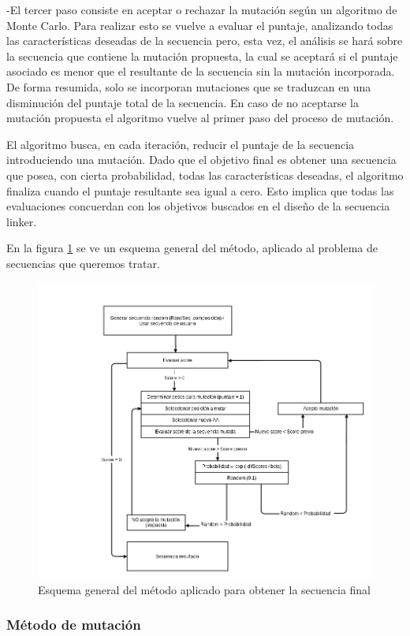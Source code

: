     -El tercer paso consiste en aceptar o rechazar la mutación según un algoritmo de Monte Carlo. Para realizar esto se vuelve a evaluar el puntaje, analizando todas las características deseadas de la secuencia pero, esta vez, el análisis se hará sobre la secuencia que contiene la mutación propuesta, la cual se aceptará si el puntaje asociado es menor que el  resultante de la secuencia sin la mutación incorporada. De forma resumida, solo se incorporan mutaciones que se traduzcan en una disminución del puntaje total de la secuencia.
En caso de no aceptarse la mutación propuesta el algoritmo vuelve al primer paso del proceso de mutación.

El algoritmo busca, en cada iteración, reducir el puntaje de la secuencia introduciendo una mutación. Dado que el objetivo final es obtener una secuencia que posea, con cierta probabilidad, todas las características deseadas, el algoritmo finaliza cuando el puntaje resultante sea igual a cero. Esto implica que todas las evaluaciones concuerdan con los objetivos buscados en el diseño de la secuencia linker.


En la figura \ref{fig:esquema-algoritmo} se ve un esquema general del método, aplicado al problema de secuencias que queremos tratar.



\begin{figure}[htbp]
\centering
   \includegraphics[width=\textwidth]{img/diagrama-algoritmo.png}
 \caption{Esquema general del método aplicado para obtener la secuencia final}
 \label{fig:esquema-algoritmo}
\end{figure}



\subsubsection{Método de mutación}
